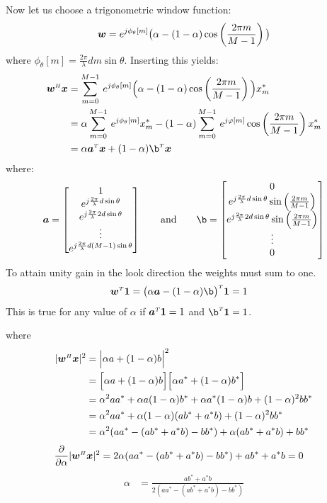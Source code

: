 Now let us choose a trigonometric window function:
%
\begin{align}
\boldsymbol{w} = e^{j\phi_\theta[m]}\big(\alpha - (1-\alpha)\cos\left(\frac{2\pi m}{M-1}\right)\big)
\end{align}
%
where $\phi_\theta[m] = \frac{2\pi}{\lambda}dm\sin\theta$. Inserting this yields:
%
\begin{align}
\w\H\x &= \sumb{m=0}{M-1} e^{j\phi_\theta[m]}\Big(\alpha - (1-\alpha)\cos\left(\frac{2\pi m}{M-1}\right)\Big) x_m^* \nn
&= \alpha\sumb{m=0}{M-1} e^{j\phi_\theta[m]} x_m^* - (1-\alpha)\sumb{m=0}{M-1} e^{j\varphi[m]}\cos\left(\frac{2\pi m}{M-1}\right) x_m^* \\
&= \alpha \a\T\x + (1-\alpha)\b\T\x
\end{align}
%
where:
%
\begin{align}
\a = \begin{bmatrix}
     1 \\
     e^{j\frac{2\pi}{\lambda}d\sin\theta} \\
     e^{j\frac{2\pi}{\lambda}2d\sin\theta} \\
     \vdots \\
     e^{j\frac{2\pi}{\lambda}d(M-1)\sin\theta}
     \end{bmatrix} \qquad \text{and} \qquad
\b = \begin{bmatrix}
     0 \\
     e^{j\frac{2\pi}{\lambda}d\sin\theta}\sin\left(\frac{2\pi m}{M-1}\right) \\
     e^{j\frac{2\pi}{\lambda}2d\sin\theta}\sin\left(\frac{2\pi m}{M-1}\right) \\
     \vdots \\
     0
     \end{bmatrix}
\end{align}
%
To attain unity gain in the look direction the weights must sum to one. 
%
\begin{align}
\w\T\1 &= \big(\alpha\a - (1-\alpha)\b\big)\T\1 = 1
\end{align}
%
This is true for any value of $\alpha$ if $\boldsymbol{a}^{\scriptscriptstyle T}\boldsymbol{1} = 1$ and $\b\T\1 = 1$. 

where
%
\begin{align}
|\boldsymbol{w}^{\scriptscriptstyle H}\boldsymbol{x}|^2 &= \Big| \alpha a + (1-\alpha)b \Big|^2 \nonumber\\
&= \Big[\alpha a + (1-\alpha)b\Big] \Big[\alpha a^* + (1-\alpha)b^*\Big] \nonumber\\
&= \alpha^2 aa^* + \alpha a(1-\alpha)b^* + \alpha a^*(1-\alpha)b + (1-\alpha)^2bb^* \nonumber\\
&= \alpha^2 aa^* + \alpha(1-\alpha)(ab^* + a^*b) + (1-\alpha)^2bb^* \nonumber\\
&= \alpha^2 (aa^* - (ab^* + a^*b) - bb^*) + \alpha(ab^* + a^*b) + bb^* \nonumber\\
\end{align}
%
\begin{align}
\frac{\partial}{\partial\alpha} |\boldsymbol{w}^{\scriptscriptstyle H}\boldsymbol{x}|^2 
&= 2\alpha (aa^* - (ab^* + a^*b) - bb^*) + ab^* + a^*b = 0
\end{align}
%
\begin{align}
\alpha &= \frac{ab^* + a^*b}{2(aa^* - (ab^* + a^*b) - bb^*)}
\end{align}

